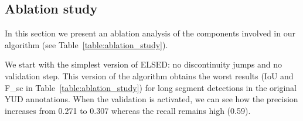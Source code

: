 \documentclass[preprint,12pt]{elsarticle}
\begin{document}
\subsection{Ablation study}
\label{sec:ablation-study}

In this section we present an ablation analysis of the components involved in our algorithm (see Table~\ref{table:ablation_study}). 
\begin{table*}
\centering
\footnotesize
{}
\caption{Results of the ablation study using our 1-to-1 evaluation protocol 
over the original Yourk Urban Data set 
annotations. Best results are marked in 
\textbf{bold}. Execution times are measured in (Intel Core i7). 
}
\label{table:ablation_study}
\end{table*}
We start with the simplest version of ELSED: no discontinuity jumps and no validation step. This version of the algorithm obtains the worst results (IoU and F\_sc in Table~\ref{table:ablation_study}) for long segment detections in the original YUD annotations. 
When the validation is activated, we can see how the precision increases from 0.271 to 0.307 whereas the recall remains high (0.59). 
\end{document}
